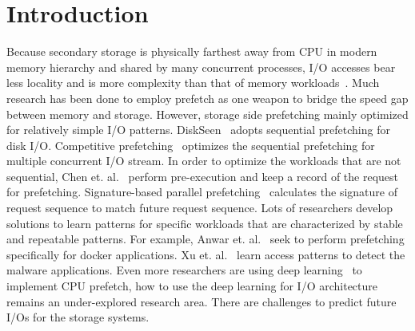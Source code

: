 \section{Introduction}

Because secondary storage is physically farthest away from CPU in modern memory hierarchy
and shared by many concurrent processes,
I/O accesses bear less locality and is more complexity than that of memory workloads~\cite{yang1992novel}.
Much research has been done to employ prefetch as one weapon to bridge the speed gap between memory and storage.
However, storage side prefetching mainly optimized for relatively simple I/O patterns.
DiskSeen~\cite{ding2007diskseen} adopts sequential prefetching for disk I/O.
Competitive prefetching~\cite{li2007competitive} optimizes the sequential prefetching for multiple concurrent I/O stream.
In order to optimize the workloads that are not sequential,
Chen et. al.~\cite{chen2008hiding} perform pre-execution and keep a record of the request for prefetching.
Signature-based parallel prefetching~\cite{byna2008parallel} calculates the signature of request sequence to match future request sequence. %
Lots of researchers develop solutions to learn patterns for
specific workloads that are characterized by stable and repeatable patterns.
For example, Anwar et. al.~\cite{anwar2018improving} seek to perform
prefetching specifically for docker applications. %
Xu et. al.~\cite{xu2017malware} learn access patterns to detect
the malware applications.
Even more researchers are using deep learning~\cite{hashemi2018learning} to implement CPU prefetch,
how to use the deep learning for I/O architecture remains an under-explored research area.
There are challenges to predict future I/Os for the storage systems.


